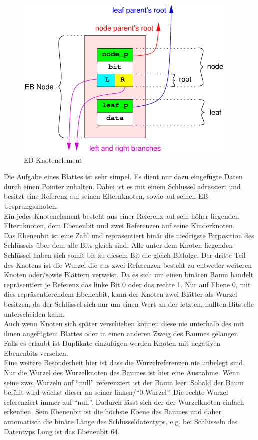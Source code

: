 \documentclass[a4paper,11pt,oneside,%
headsepline,												%
footsepline,												%
bibtotocnumbered									%
]{scrreprt}
\begin{document}
\begin{figure}
  \begin{center}
    \includegraphics[width=.6\linewidth]{bilder/Ebnode.png}
  \end{center}
 \caption{EB-Knotenelement}
\end{figure}
Die Aufgabe eines Blattes ist sehr simpel. Es dient nur dazu eingefügte Daten durch einen Pointer zuhalten. Dabei ist es mit einem Schlüssel adressiert und besitzt eine Referenz auf seinen Elternknoten, sowie auf seinen EB-Ursprungsknoten.\\

Ein jedes Knotenelement besteht aus einer Referenz auf sein höher liegenden Elternknoten, dem Ebenenbit  und zwei Referenzen auf seine Kinderknoten. \\ Das Ebenenbit ist eine Zahl und repräsentiert binär die niedrigste Bitposition des Schlüssels über dem alle Bits gleich sind. Alle unter dem Knoten liegenden Schlüssel haben sich somit bis zu diesem Bit die gleich Bitfolge. Der dritte Teil des Knotens ist die Wurzel die aus zwei Referenzen besteht zu entweder weiteren Knoten oder/sowie Blättern verweist. Da es sich um einen binären Baum handelt repräsentiert je Referenz das linke Bit 0 oder das rechte 1. Nur auf Ebene 0, mit dies repräsentierendem Ebenenbit, kann der Knoten zwei Blätter als Wurzel besitzen, da der Schlüssel sich nur um einen Wert an der letzten, nullten Bitstelle unterscheiden kann.\\
Auch wenn Knoten sich später verschieben können diese nie unterhalb des mit ihnen angefügtem Blattes oder in einen anderen Zweig des Baumes gelangen. Falls es erlaubt ist Duplikate einzufügen werden  Knoten mit negativen Ebenenbits versehen.\\

Eine weitere Besonderheit hier ist dass die Wurzelreferenzen nie unbelegt sind. Nur die Wurzel des Wurzelknoten des Baumes ist hier eine Ausnahme. Wenn seine zwei Wurzeln auf \enquote{null} referenziert ist der Baum leer. Sobald der Baum befüllt wird wächst dieser an seiner linken/\enquote{0-Wurzel}. Die rechte Wurzel referenziert immer auf \enquote{null}. Dadurch lässt sich der der Wurzelknoten einfach erkennen.
Sein Ebenenbit ist die höchste Ebene des Baumes und daher automatisch die binäre Länge des Schlüsseldatentyps, e.g. bei Schlüsseln des Datentyps Long ist das Ebenenbit 64.\\
\end{document}
